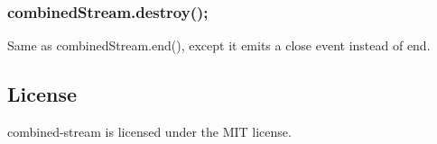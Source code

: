 \subsubsection*{combined\+Stream.\+destroy();}

Same as {\ttfamily combined\+Stream.\+end()}, except it emits a {\ttfamily \textquotesingle{}close\textquotesingle{}} event instead of {\ttfamily \textquotesingle{}end\textquotesingle{}}.

\subsection*{License}

combined-\/stream is licensed under the M\+I\+T license. 